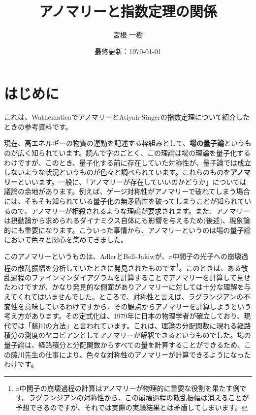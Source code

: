 \documentclass[unicode,a4paper,10pt]{ltjsarticle}
\begin{document}
\title{
  アノマリーと指数定理の関係
}
\author{
  宮根 一樹
}
\date{最終更新：\today}

\maketitle
\tableofcontents

\section{はじめに}

これは、WathematicaでアノマリーとAtiyah-Singerの指数定理について紹介したときの参考資料です。

現在、高エネルギーの物質の運動を記述する枠組みとして、\textbf{場の量子論}というものが広く知られています。読んで字のごとく、この理論は場の理論を量子化するわけですが、このとき、量子化する前に存在していた対称性が、量子論では成立しないような状況というものが色々と調べられています。これらのものを\textbf{アノマリー}といいます。一般に、「アノマリーが存在していいのかどうか」については議論の余地があります。例えば、ゲージ対称性がアノマリーで破れてしまう場合には、そもそも知られている量子化の無矛盾性を破ってしまうことが知られているので、アノマリーが相殺されるような理論が要求されます。また、アノマリーは摂動論から求められるダイナミクス自体にも影響を与えるため(後述)、現象論的にも重要になります。こういった事情から、アノマリーというのは場の量子論において色々と関心を集めてきました。

このアノマリーというものは、Adler\cite{Adler:1969gk}とBell-Jakiw\cite{Bell:1969ts}が、$\pi$中間子の光子への崩壊過程の散乱振幅を分析していたときに発見されたものです\footnote{
  $\pi$中間子の崩壊過程の計算はアノマリーが物理的に重要な役割を果たす例です。ラグランジアンの対称性から、この崩壊過程の散乱振幅は消えることが予想できるのですが、それでは実際の実験結果とは矛盾してしまいます。
}。このときは、ある散乱過程のファインマンダイアグラムを計算することでアノマリーを計算して見せたわけですが、かなり発見的な側面がありアノマリーに対しては十分な理解を与えてくれてはいませんでした。ところで、対称性と言えば、ラグランジアンの不変性を意味しているわけですから、その観点からアノマリーを計算しようという考え方があります。その定式化は、1979年に日本の物理学者が確立しており、現代では「藤川の方法」と言われています\cite{Fujikawa:1979ay}。これは、理論の分配関数に現れる経路積分の測度のヤコビアンとしてアノマリーが解釈できるというものでした。場の量子論は、経路積分と分配関数からすべての量を計算することができるため、この藤川先生の仕事により、色々な対称性のアノマリーが計算できるようになったわけです。
\end{document}
